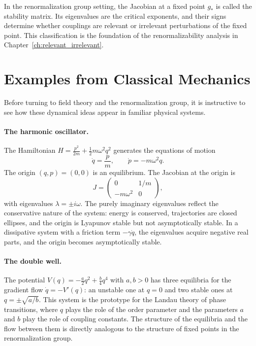 \documentclass[11pt, twoside, openright]{book}
\theoremstyle{dotted}
\theoremstyle{definition}
\begin{document}
In the renormalization group setting, the Jacobian at a fixed point $g_*$ is called
the stability matrix. Its eigenvalues are the critical exponents, and their signs
determine whether couplings are relevant or irrelevant perturbations of the fixed
point. This classification is the foundation of the renormalizability analysis in
Chapter~\ref{ch:relevant_irrelevant}.

\section{Examples from Classical Mechanics}

Before turning to field theory and the renormalization group, it is instructive to
see how these dynamical ideas appear in familiar physical systems.

\paragraph{The harmonic oscillator.} The Hamiltonian
$H = \frac{p^2}{2m} + \frac{1}{2}m\omega^2 q^2$ generates the equations of motion
\begin{equation}
  \dot q = \frac{p}{m}, \qquad \dot p = -m\omega^2 q.
\end{equation}
The origin $(q,p) = (0,0)$ is an equilibrium. The Jacobian at the origin is
\begin{equation}
  J = \begin{pmatrix} 0 & 1/m \\ -m\omega^2 & 0 \end{pmatrix},
\end{equation}
with eigenvalues $\lambda = \pm i\omega$. The purely imaginary eigenvalues reflect
the conservative nature of the system: energy is conserved, trajectories are
closed ellipses, and the origin is Lyapunov stable but not asymptotically stable.
In a dissipative system with a friction term $-\gamma \dot q$, the eigenvalues
acquire negative real parts, and the origin becomes asymptotically stable.

\paragraph{The double well.} The potential $V(q) = -\frac{a}{2}q^2 + \frac{b}{4}q^4$
with $a, b > 0$ has three equilibria for the gradient flow $\dot q = -V'(q)$:
an unstable one at $q = 0$ and two stable ones at $q = \pm\sqrt{a/b}$. This system
is the prototype for the Landau theory of phase transitions, where $q$ plays the
role of the order parameter and the parameters $a$ and $b$ play the role of
coupling constants. The structure of the equilibria and the flow between them is
directly analogous to the structure of fixed points in the renormalization group.
\end{document}
